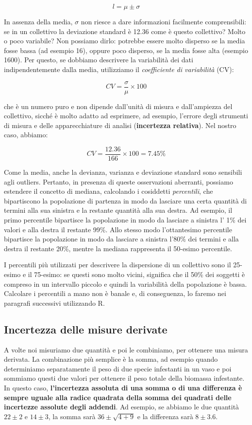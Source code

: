 \documentclass[a4paper,12pt,oneside]{book}
\begin{document}
\[l = \mu \pm \sigma\]

In assenza della media, \(\sigma\) non riesce a dare informazioni facilmente comprensibili: se in un collettivo la deviazione standard è 12.36 come è questo collettivo? Molto o poco variabile? Non possiamo dirlo: potrebbe essere molto disperso se la media fosse bassa (ad esempio 16), oppure poco disperso, se la media fosse alta (esempio 1600). Per questo, se dobbiamo descrivere la variabilità dei dati indipendentemente dalla media, utilizziamo il \emph{coefficiente di variabilità} (CV):

\[CV = \frac{\sigma }{\mu } \times 100\]

che è un numero puro e non dipende dall'unità di misura e dall'ampiezza del collettivo, sicché è molto adatto ad esprimere, ad esempio, l'errore degli strumenti di misura e delle apparecchiature di analisi (\textbf{incertezza relativa}). Nel nostro caso, abbiamo:

\[CV = \frac{12.36}{166} \times 100 = 7.45 \%\]

Come la media, anche la devianza, varianza e deviazione standard sono sensibili agli outliers. Pertanto, in presenza di queste osservazioni aberranti, possiamo estendere il concetto di mediana, calcolando i cosiddetti \emph{percentili}, che bipartiscono la popolazione di partenza in modo da lasciare una certa quantità di termini alla sua sinistra e la restante quantità alla sua destra. Ad esempio, il primo percentile bipartisce la popolazione in modo da lasciare a sinistra l' 1\% dei valori e alla destra il restante 99\%. Allo stesso modo l'ottantesimo percentile bipartisce la popolazione in modo da lasciare a sinistra l'80\% dei termini e alla destra il restante 20\%, mentre la mediana rappresenta il 50-esimo percentile.

I percentili più utilizzati per descrivere la dispersione di un collettivo sono il 25-esimo e il 75-esimo: se questi sono molto vicini, significa che il 50\% dei soggetti è compreso in un intervallo piccolo e quindi la variabilità della popolazione è bassa. Calcolare i percentili a mano non è banale e, di conseguenza, lo faremo nei paragrafi successivi utilizzando R.

\hypertarget{incertezza-delle-misure-derivate}{%
\subsection{Incertezza delle misure derivate}\label{incertezza-delle-misure-derivate}}

A volte noi misuriamo due quantità e poi le combiniamo, per ottenere una misura derivata. La combinazione più semplice è la somma, ad esempio quando determiniamo separatamente il peso di due specie infestanti in un vaso e poi sommiamo questi due valori per ottenere il peso totale della biomassa infestante. In questo caso, \textbf{l'incertezza assoluta di una somma o di una differenza è sempre uguale alla radice quadrata della somma dei quadrati delle incertezze assolute degli addendi}. Ad esempio, se abbiamo le due quantità \(22 \pm 2\) e \(14 \pm 3\), la somma sarà \(36 \pm \sqrt{4 + 9}\) e la differenza sarà \(8 \pm 3.6\).
\end{document}

